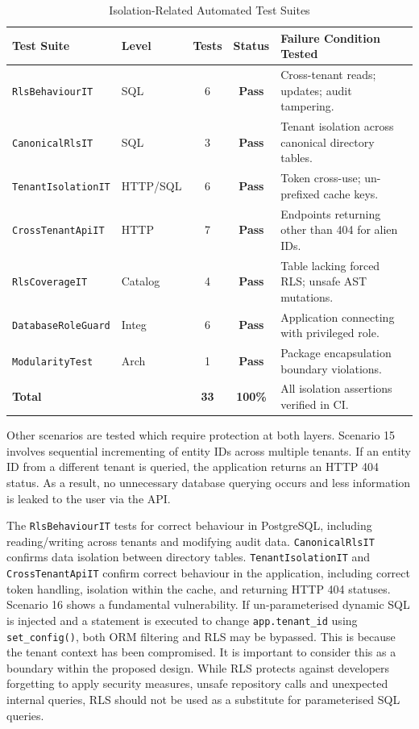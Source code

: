 \documentclass[conference]{IEEEtran}
\begin{document}
\begin{table}[t]
\renewcommand{\arraystretch}{0.95}
\caption{Isolation-Related Automated Test Suites}
\label{tab:tests}
\centering
\scriptsize
\setlength{\tabcolsep}{2.5pt}
\begin{tabular}{llccp{2.7cm}}
\toprule
\textbf{Test Suite} & \textbf{Level} & \textbf{Tests} & \textbf{Status} & \textbf{Failure Condition Tested} \\
\midrule
\texttt{RlsBehaviourIT} & SQL & 6 & \textbf{Pass} & Cross-tenant reads; updates; audit tampering. \\
\texttt{CanonicalRlsIT} & SQL & 3 & \textbf{Pass} & Tenant isolation across canonical directory tables. \\
\texttt{TenantIsolationIT} & HTTP/SQL & 6 & \textbf{Pass} & Token cross-use; un-prefixed cache keys. \\
\texttt{CrossTenantApiIT} & HTTP & 7 & \textbf{Pass} & Endpoints returning other than 404 for alien IDs. \\
\texttt{RlsCoverageIT} & Catalog & 4 & \textbf{Pass} & Table lacking forced RLS; unsafe AST mutations. \\
\texttt{DatabaseRoleGuard} & Integ & 6 & \textbf{Pass} & Application connecting with privileged role. \\
\texttt{ModularityTest} & Arch & 1 & \textbf{Pass} & Package encapsulation boundary violations. \\
\midrule
\textbf{Total} & & \textbf{33} & \textbf{100\%} & All isolation assertions verified in CI. \\
\bottomrule
\end{tabular}
\end{table}

Other scenarios are tested which require protection at both layers. Scenario 15 involves sequential incrementing of entity IDs across multiple tenants. If an entity ID from a different tenant is queried, the application returns an HTTP 404 status. As a result, no unnecessary database querying occurs and less information is leaked to the user via the API.

The \texttt{RlsBehaviourIT} tests for correct behaviour in PostgreSQL, including reading/writing across tenants and modifying audit data. \texttt{CanonicalRlsIT} confirms data isolation between directory tables. \texttt{TenantIsolationIT} and \texttt{CrossTenantApiIT} confirm correct behaviour in the application, including correct token handling, isolation within the cache, and returning HTTP 404 statuses. Scenario 16 shows a fundamental vulnerability. If un-parameterised dynamic SQL is injected and a statement is executed to change \texttt{app.tenant\_id} using \texttt{set\_config()}, both ORM filtering and RLS may be bypassed. This is because the tenant context has been compromised. It is important to consider this as a boundary within the proposed design. While RLS protects against developers forgetting to apply security measures, unsafe repository calls and unexpected internal queries, RLS should not be used as a substitute for parameterised SQL queries.
\end{document}
